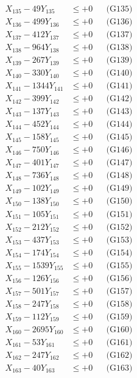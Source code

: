 \documentclass[a4paper,10pt]{article}
\begin{document}
{\begin{align}
X_{135} - 49Y_{135} &\leq +0 && \text{(G135)} \\
X_{136} - 499Y_{136} &\leq +0 && \text{(G136)} \\
X_{137} - 412Y_{137} &\leq +0 && \text{(G137)} \\
X_{138} - 964Y_{138} &\leq +0 && \text{(G138)} \\
X_{139} - 267Y_{139} &\leq +0 && \text{(G139)} \\
X_{140} - 330Y_{140} &\leq +0 && \text{(G140)} \\
\allowbreak
X_{141} - 1344Y_{141} &\leq +0 && \text{(G141)} \\
X_{142} - 399Y_{142} &\leq +0 && \text{(G142)} \\
X_{143} - 137Y_{143} &\leq +0 && \text{(G143)} \\
X_{144} - 452Y_{144} &\leq +0 && \text{(G144)} \\
X_{145} - 158Y_{145} &\leq +0 && \text{(G145)} \\
X_{146} - 750Y_{146} &\leq +0 && \text{(G146)} \\
X_{147} - 401Y_{147} &\leq +0 && \text{(G147)} \\
X_{148} - 736Y_{148} &\leq +0 && \text{(G148)} \\
X_{149} - 102Y_{149} &\leq +0 && \text{(G149)} \\
X_{150} - 138Y_{150} &\leq +0 && \text{(G150)} \\
\allowbreak
X_{151} - 105Y_{151} &\leq +0 && \text{(G151)} \\
X_{152} - 212Y_{152} &\leq +0 && \text{(G152)} \\
X_{153} - 437Y_{153} &\leq +0 && \text{(G153)} \\
X_{154} - 174Y_{154} &\leq +0 && \text{(G154)} \\
X_{155} - 1539Y_{155} &\leq +0 && \text{(G155)} \\
X_{156} - 126Y_{156} &\leq +0 && \text{(G156)} \\
X_{157} - 501Y_{157} &\leq +0 && \text{(G157)} \\
X_{158} - 247Y_{158} &\leq +0 && \text{(G158)} \\
X_{159} - 112Y_{159} &\leq +0 && \text{(G159)} \\
X_{160} - 2695Y_{160} &\leq +0 && \text{(G160)} \\
\allowbreak
X_{161} - 53Y_{161} &\leq +0 && \text{(G161)} \\
X_{162} - 247Y_{162} &\leq +0 && \text{(G162)} \\
X_{163} - 40Y_{163} &\leq +0 && \text{(G163)} \\

\end{align}}
\end{document}
